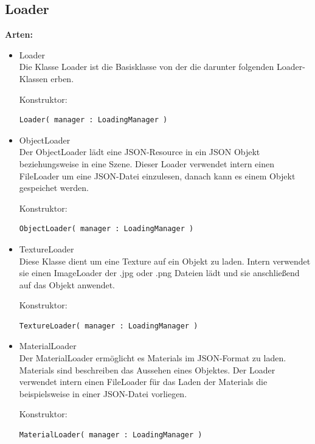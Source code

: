 \subsection{Loader}\label{sec:Loader}
\textbf{Arten:} \\
\begin{itemize}
    \item Loader \cite{three.js_loader}\\
    Die Klasse Loader ist die Basisklasse von der die darunter folgenden Loader-Klassen erben.
    
    Konstruktor:
    \begin{lstlisting}
Loader( manager : LoadingManager )
    \end{lstlisting}
    
    
    \item ObjectLoader \cite{three.js_objectLoader}\\
    Der ObjectLoader lädt eine JSON-Resource in ein JSON Objekt beziehungsweise in eine Szene. Dieser Loader verwendet intern einen FileLoader um eine JSON-Datei einzulesen, danach kann es einem Objekt gespeichet werden.
    
    Konstruktor:
    \begin{lstlisting}
ObjectLoader( manager : LoadingManager )
    \end{lstlisting}
    
    
    \item TextureLoader \cite{three.js_TextureLoader}\\
    Diese Klasse dient um eine Texture auf ein Objekt zu laden. Intern verwendet sie einen ImageLoader der .jpg oder .png Dateien lädt und sie anschließend auf das Objekt anwendet.
    
    Konstruktor:
    \begin{lstlisting}
TextureLoader( manager : LoadingManager )
    \end{lstlisting}
    
    
    \item MaterialLoader \cite{three.js_materialLoader}\\
    Der MaterialLoader ermöglicht es Materials im JSON-Format zu laden. Materials sind beschreiben das Aussehen eines Objektes. Der Loader verwendet intern einen FileLoader für das Laden der Materials die beispielsweise in einer JSON-Datei vorliegen. 
    
    Konstruktor:
    \begin{lstlisting}
MaterialLoader( manager : LoadingManager )
    \end{lstlisting}
    

\end{itemize}
